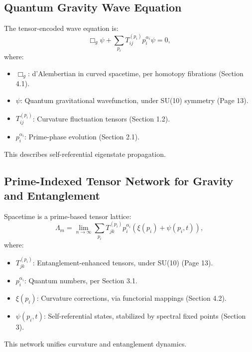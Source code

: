 \documentclass{article}
\theoremstyle{plain}
\begin{document}
\subsection{Quantum Gravity Wave Equation}
The tensor-encoded wave equation is:
\begin{equation}
\Box_g \psi + \sum_{p_i} T_{ij}^{(p_i)} p_i^{\alpha_i} \psi = 0,
\end{equation}
where:
\begin{itemize}
    \item \( \Box_g \): d'Alembertian in curved spacetime, per homotopy fibrations (Section 4.1).
    \item \( \psi \): Quantum gravitational wavefunction, under SU(10) symmetry (Page 13).
    \item \( T_{ij}^{(p_i)} \): Curvature fluctuation tensors (Section 1.2).
    \item \( p_i^{\alpha_i} \): Prime-phase evolution (Section 2.1).
\end{itemize}
This describes self-referential eigenstate propagation.

\subsection{Prime-Indexed Tensor Network for Gravity and Entanglement}
Spacetime is a prime-based tensor lattice:
\begin{equation}
\Lambda_m = \lim_{n\to\infty} \sum_{p_i} T_{jk}^{(p_i)} p_i^{\alpha_i} \left( \xi(p_i) + \psi(p_i, t) \right),
\end{equation}
where:
\begin{itemize}
    \item \( T_{jk}^{(p_i)} \): Entanglement-enhanced tensors, under SU(10) (Page 13).
    \item \( p_i^{\alpha_i} \): Quantum numbers, per Section 3.1.
    \item \( \xi(p_i) \): Curvature corrections, via functorial mappings (Section 4.2).
    \item \( \psi(p_i, t) \): Self-referential states, stabilized by spectral fixed points (Section 3).
\end{itemize}
This network unifies curvature and entanglement dynamics.
\end{document}
